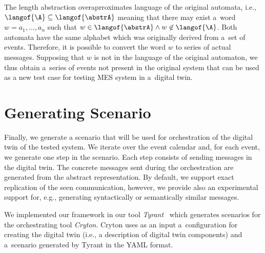 {The length abstraction overaprroximates language of the original automata, i.e.,
$\langof{\A}\subseteq\langof{\abstrA}$ meaning that there may exist a~word
$w=a_1,\ldots,a_n$ such that $w\in\langof{\abstrA} \wedge w\not\in\langof{\A}$.
Both automata have the same alphabet which was originally derived from a~set of
events.  Therefore, it is possible to convert the word $w$ to series of actual
messages.  Supposing that $w$ is not in the language of the original automaton,
we thus obtain a~series of events not present in the original system that can
be used as a new test case for testing MES system in a~digital twin.

\section{Generating Scenario}
\label{sec:scenario}

Finally, we generate a scenario that will be used for orchestration of the
digital twin of the tested system.
%
We iterate over the event calendar and, for each event, we generate one step in
the scenario.
%
Each step consists of sending messages in the digital twin.
%
The concrete messages sent during the orchestration are generated from the
abstract representation.
%
By default, we support exact replication of the seen communication, however, we
provide also an experimental support for, e.g., generating syntactically or
semantically similar messages.

We implemented our framework in our tool \emph{Tyrant}~\cite{ref_tyrant} which
generates scenarios for the orchestrating tool \emph{Cryton}.
%
Cryton uses as an input a~configuration for creating the digital twin (i.e., a
description of digital twin components) and a~scenario generated by Tyrant in
the YAML format.
%

}
